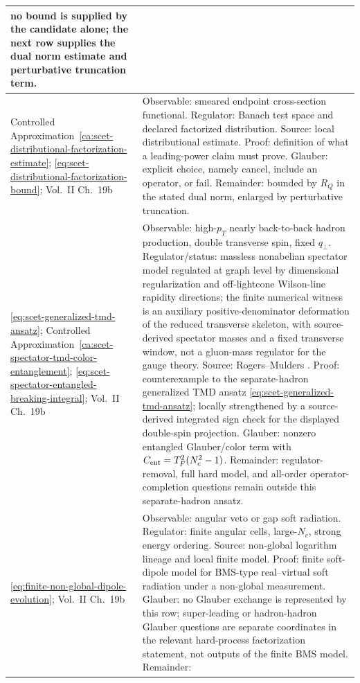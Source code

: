 {\begin{longtable}{@{}>{\raggedright\arraybackslash}p{}>{\raggedright\arraybackslash}p{}@{}}
no bound is supplied by the candidate alone; the next row supplies the dual
norm estimate and perturbative truncation term.
\\ \hline
Controlled Approximation~\ref{ca:scet-distributional-factorization-estimate};
\eqref{eq:scet-distributional-factorization-bound};
Vol.~II Ch.~19b &
Observable: smeared endpoint cross-section functional.  Regulator: Banach
test space and declared factorized distribution.  Source: local
distributional estimate.  Proof: definition of what a leading-power claim must
prove.  Glauber: explicit choice, namely cancel, include an operator, or fail.
Remainder: bounded by \(R_Q\) in the stated dual norm, enlarged by
perturbative truncation.
\\ \hline
\eqref{eq:scet-generalized-tmd-ansatz};
Controlled Approximation~\ref{ca:scet-spectator-tmd-color-entanglement};
\eqref{eq:scet-spectator-entangled-breaking-integral};
Vol.~II Ch.~19b &
Observable: high-\(p_T\) nearly back-to-back hadron production, double
transverse spin, fixed \(q_\perp\).  Regulator/status: massless nonabelian
spectator model regulated at graph level by dimensional regularization and
off-lightcone Wilson-line rapidity directions; the finite numerical witness is
an auxiliary positive-denominator deformation of the reduced transverse
skeleton, with source-derived spectator masses and a fixed transverse window,
not a gluon-mass regulator for the gauge theory.  Source: Rogers--Mulders
\cite{RogersMulders2010NoGeneralizedTMD}.  Proof: counterexample to the
separate-hadron generalized TMD ansatz
\eqref{eq:scet-generalized-tmd-ansatz}; locally strengthened by a
source-derived integrated sign check for the displayed double-spin projection.
Glauber: nonzero entangled Glauber/color term with
\(C_{\rm ent}=T_F^2(N_c^2-1)\).  Remainder: regulator-removal, full hard
model, and all-order operator-completion questions remain outside this
separate-hadron ansatz.
\\ \hline
\eqref{eq:finite-non-global-dipole-evolution};
Vol.~II Ch.~19b &
Observable: angular veto or gap soft radiation.  Regulator: finite angular
cells, large-\(N_c\), strong energy ordering.  Source: non-global logarithm
lineage \cite{DasguptaSalam2001NonGlobal,BanfiMarchesiniSmye2002NonGlobal}
and local finite model.  Proof: finite soft-dipole model for BMS-type
real--virtual soft radiation under a non-global measurement.  Glauber: no
Glauber exchange is represented by this row; super-leading or hadron-hadron
Glauber questions are separate coordinates in the relevant hard-process
factorization statement, not outputs of the finite BMS model.  Remainder:

\end{longtable}}
